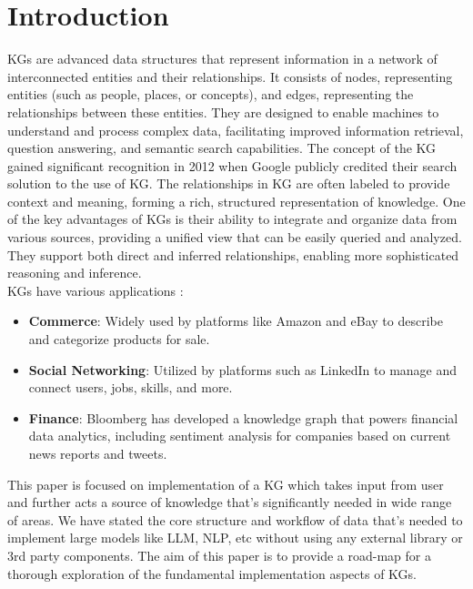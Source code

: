 \documentclass[conference]{IEEEtran}
\begin{document}
\section{Introduction}
KGs are advanced data structures that represent information in a network of interconnected entities and their relationships. It consists of nodes, representing entities (such as people, places, or concepts), and edges, representing the relationships between these entities. They are designed to enable machines to understand and process complex data, facilitating improved information retrieval, question answering, and semantic search capabilities.
The concept of the KG gained significant recognition in 2012 when Google \cite{b7} publicly credited their search solution to the use of KG.
The relationships in KG are often labeled to provide context and meaning, forming a rich, structured representation of knowledge.
One of the key advantages of KGs is their ability to integrate and organize data from various sources, providing a unified view that can be easily queried and analyzed. They support both direct and inferred relationships, enabling more sophisticated reasoning and inference.
\\KGs have various applications : 
\begin{itemize}
    \item \textbf{Commerce}: Widely used by platforms like Amazon\cite{b2, b3} and eBay\cite{b4} to describe and categorize products for sale.
    \item \textbf{Social Networking}: Utilized by platforms such as LinkedIn\cite{b5} to manage and connect users, jobs, skills, and more.
    \item \textbf{Finance}: Bloomberg\cite{b6} has developed a knowledge graph that powers financial data analytics, including sentiment analysis for companies based on current news reports and tweets.
\end{itemize}

This paper is focused on implementation of a KG which takes input from user and further acts a source of knowledge that's significantly needed in wide range of areas. We have stated the core structure and workflow of data that's needed to implement large models like LLM, NLP, etc without using any external library or 3rd party components.
The aim of this paper is to provide a road-map for a thorough exploration of the fundamental implementation aspects of KGs.
\end{document}
